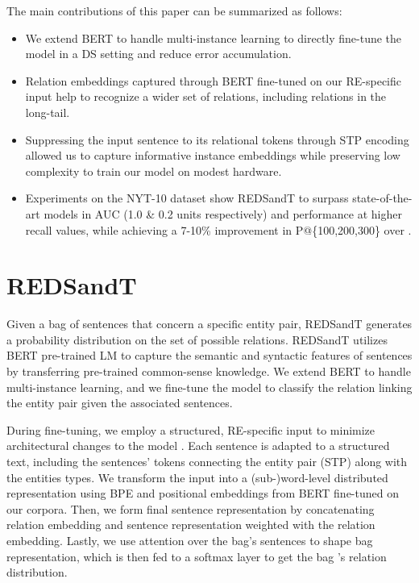 \documentclass[11pt,a4paper]{article}
\begin{document}
The main contributions of this paper can be summarized as follows:
\begin{itemize}[noitemsep,nolistsep]
    \item We extend BERT to handle multi-instance learning to directly fine-tune the model in a DS setting and reduce error accumulation.
    \item Relation embeddings captured through BERT fine-tuned on our RE-specific input help to recognize a wider set of relations, including relations in the long-tail.
    \item Suppressing the input sentence to its relational tokens through STP encoding allowed us to capture informative instance embeddings while preserving low complexity to train our model on modest hardware.
    \item Experiments on the NYT-10 dataset show REDSandT to surpass state-of-the-art models \cite{Vashishth2018, Alt2019} in AUC (1.0 \& 0.2 units respectively) and performance at higher recall values, while achieving a 7-10\% improvement in P@\{100,200,300\} over \cite{Alt2019}.
\end{itemize}



\section{REDSandT}
\label{sect:redsandt}
Given a bag of sentences  that concern a specific entity pair, REDSandT generates a probability distribution on the set of possible relations. REDSandT utilizes BERT pre-trained LM to capture the semantic and syntactic features of sentences by transferring pre-trained common-sense knowledge. We extend BERT to handle multi-instance learning, and we fine-tune the model to classify the relation linking the entity pair given the associated sentences. 

During fine-tuning, we employ a structured, RE-specific input to minimize architectural changes to the model \cite{Radford2018}. Each sentence is adapted to a structured text, including the sentences' tokens connecting the entity pair (STP) along with the entities types. We transform the input into a (sub-)word-level distributed representation using BPE and positional embeddings from BERT fine-tuned on our corpora. Then, we form final sentence representation by concatenating relation embedding and sentence representation weighted with the relation embedding. Lastly, we use attention over the bag's sentences to shape bag representation, which is then fed to a softmax layer to get the bag 's relation distribution. 
\end{document}
